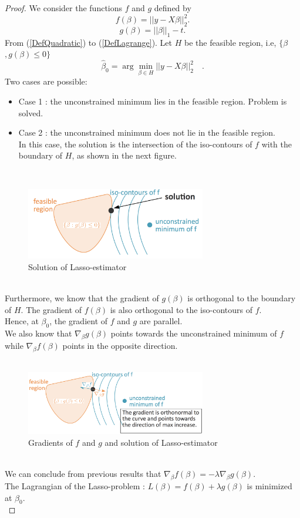 \documentclass[a4paper,12pt]{article}
\begin{document}
\begin{proof}
We consider the functions $f$ and $g$ defined by
\[ f(\beta) = ||y - X\beta||_2^2.\]
\[ g(\beta) = ||\beta||_1 - t.\]
From (\ref{DefQuadratic}) to (\ref{DefLagrange}). Let $H$ be the feasible region, i.e, $\{ \beta$ $, g(\beta) \leq 0\}$
\[ \hat{\beta}_\text{0} = \arg \min_{\beta \in H} ||y - X\beta||_2^2 \quad.\]
Two cases are possible:\\
\begin{itemize}
\item Case 1 : the unconstrained minimum lies in the feasible region. Problem is solved.
\item Case 2 : the unconstrained minimum does not lie in the feasible region. \\
In this case, the solution is the intersection of the iso-contours of $f$ with the boundary of $H$, as shown in the next figure.
\end{itemize}
~\\
\begin{figure}[!h]
\centerline{
\includegraphics[width = 0.7\textwidth]{figures/sol_lasso.png}}
\caption{Solution of Lasso-estimator}
\label{SolutionLasso}
\end{figure}
~\\
Furthermore, we know that the gradient of $g(\beta)$ is orthogonal to the boundary of $H$.
The gradient of $f(\beta)$ is also orthogonal to the iso-contours of $f$.\\
Hence, at $\beta_{0}$, the gradient of $f$ and $g$ are parallel.\\
We also know that $\nabla_{\beta}g(\beta)$ points towards the unconstrained minimum of $f$ while $\nabla_{\beta}f(\beta)$ points in the opposite direction.\\
~\\
\begin{figure}[!h]
\centerline{
\includegraphics[width = 0.7\textwidth]{figures/sol_lasso2.png}}
\caption{Gradients of $f$ and $g$ and solution of Lasso-estimator}
\label{SolutionLasso2}
\end{figure}
~\\
We can conclude from previous results that $\nabla_{\beta}f(\beta) = -\lambda \nabla_{\beta}g(\beta)$.\\
The Lagrangian of the Lasso-problem : $L(\beta) = f(\beta) + \lambda g(\beta)$ is minimized at $\beta_{0}$. \\


\end{proof}
\end{document}
